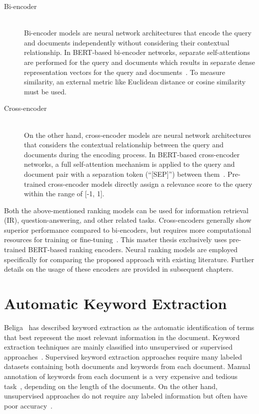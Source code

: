 \begin{description}
	\item[Bi-encoder]  \hfill \\ Bi-encoder models are neural network architectures that encode the query and documents independently without considering their contextual relationship. In BERT-based bi-encoder networks, separate self-attentions are performed for the query and documents which results in separate dense representation vectors for the query and documents~\cite{choi2021improving}. To measure similarity, an external metric like Euclidean distance or cosine similarity must be used.
	 
	\item[Cross-encoder]  \hfill \\ On the other hand, cross-encoder models are neural network architectures that considers the contextual relationship between the query and documents during the encoding process. In BERT-based cross-encoder networks, a full self-attention mechanism is applied to the query and document pair with a separation token (``[SEP]'') between them~\cite{choi2021improving}. Pre-trained cross-encoder models directly assign a relevance score to the query within the range of [-1, 1].
	
\end{description}

Both the above-mentioned ranking models can be used for information retrieval (IR), question-answering, and other related tasks. Cross-encoders generally show superior performance compared to bi-encoders, but requires more computational resources for training or fine-tuning~\cite{choi2021improving, jung2022semi}. This master thesis exclusively uses pre-trained BERT-based ranking encoders. Neural ranking models are employed specifically for comparing the proposed approach with existing literature. Further details on the usage of these encoders are provided in subsequent chapters.

\section{Automatic Keyword Extraction}

Beliga~\cite{beliga2014keyword} has described keyword extraction as the automatic identification of terms that best represent the most relevant information in the document. Keyword extraction techniques are mainly classified into unsupervised or supervised approaches~\cite{bennani2018simple}. Supervised keyword extraction approaches require many labeled datasets containing both documents and keywords from each document. Manual annotation of keywords from each document is a very expensive and tedious task~\cite{beliga2014keyword}, depending on the length of the documents. On the other hand, unsupervised approaches do not require any labeled information but often have poor accuracy~\cite{bennani2018simple}.


